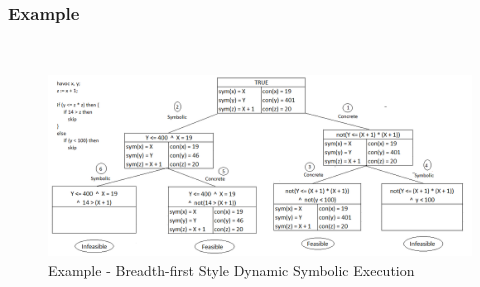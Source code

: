 \documentclass[11pt]{llncs}
\begin{document}
\begin{enumerate}
				
				\subsubsection{Example}
					~
					\begin{figure}[H]
						\includegraphics[width=1.08\textwidth]{DSE_BFS_Example.png}
						\caption{Example - Breadth-first Style Dynamic Symbolic Execution} \label{fig_2}
					\end{figure}
		
				\vspace{-12mm}

		
				
                \vspace{-3mm}
					
					
			\vspace{9mm}


\end{enumerate}
\end{document}
